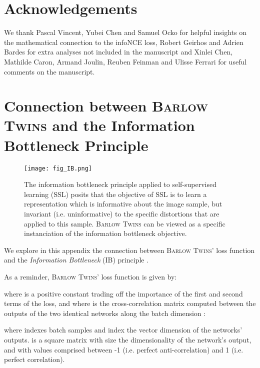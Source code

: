 \documentclass{article}
\newcommand{\AlgoName}{\textsc{Barlow Twins}}
\begin{document}
 \section*{Acknowledgements}
We thank Pascal Vincent, Yubei Chen and Samuel Ocko for helpful insights on the mathematical connection to the infoNCE loss, Robert Geirhos and Adrien Bardes for extra analyses not included in the manuscript and Xinlei Chen, Mathilde Caron, Armand Joulin, Reuben Feinman and Ulisse Ferrari for useful comments on the manuscript.



\newpage
\appendix





\section{Connection between \AlgoName{} and the Information Bottleneck Principle}

\begin{figure}[ht]
\vskip 0.2in
\begin{center}
\centerline{\texttt{[image: fig\_IB.png]}}
\caption{The information bottleneck principle applied to self-supervised learning (SSL) posits that the objective of SSL is to learn a representation  which is informative about the image sample, but invariant (i.e. uninformative) to the specific distortions that are applied to this sample. \AlgoName{} can be viewed as a specific instanciation of the information bottleneck objective.}
\label{fig:fig_IB}
\end{center}
\vskip -0.2in
\end{figure}

We explore in this appendix the connection between \AlgoName{}' loss function and the \emph{Information Bottleneck} (IB) principle \cite{tishby_deep_2015,tishby_information_2000}. 

As a reminder, \AlgoName{}' loss function is given by:



where  is a positive constant trading off the importance of the first and second terms of the loss, and where  is the cross-correlation matrix computed between the outputs of the two identical networks along the batch dimension :



where  indexes batch samples and  index the vector dimension of the networks' outputs.  is a square matrix with size the dimensionality of the network's output, and with values comprised between -1 (i.e. perfect anti-correlation) and 1 (i.e. perfect correlation). 
\end{document}
